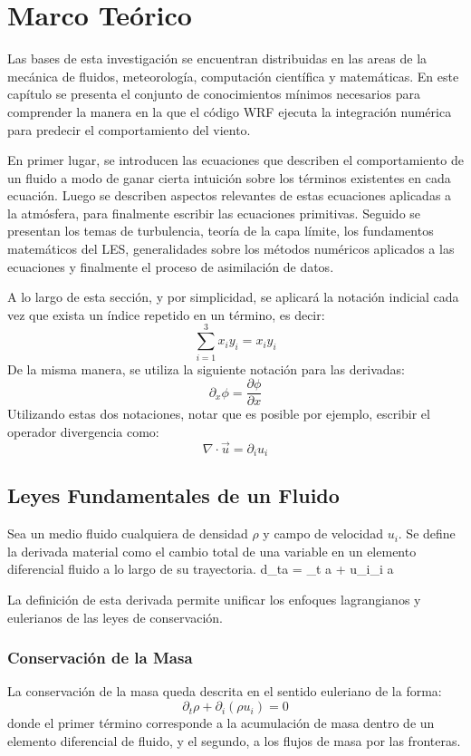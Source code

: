 \chapter{Marco Teórico}
Las bases de esta investigación se encuentran distribuidas en las areas de la mecánica de fluidos, meteorología, computación científica y matemáticas. En este capítulo se presenta el conjunto de conocimientos mínimos necesarios para comprender la manera en la que el código WRF ejecuta la integración numérica para predecir el comportamiento del viento. 

En primer lugar, se introducen las ecuaciones que describen el comportamiento de un fluido a modo de ganar cierta intuición sobre los términos existentes en cada ecuación. Luego se describen aspectos relevantes de estas ecuaciones aplicadas a la atmósfera, para finalmente escribir las ecuaciones primitivas. Seguido se presentan los temas de turbulencia, teoría de la capa límite, los fundamentos matemáticos del LES, generalidades sobre los métodos numéricos aplicados a las ecuaciones y finalmente el proceso de asimilación de datos.

A lo largo de esta sección, y por simplicidad, se aplicará la notación indicial cada vez que exista un índice repetido en un término, es decir:
\begin{equation}\label{eq:indicial}
\sum_{i=1}^{3}\! x_i y_i = x_i y_i
\end{equation}
De la misma manera, se utiliza la siguiente notación para las derivadas:
\begin{equation}
\partial_x \phi = \frac{\partial \phi}{\partial x}
\end{equation}
Utilizando estas dos notaciones, notar que es posible por ejemplo, escribir el operador divergencia como:
\begin{equation}\label{eq:divergencia}
\nabla\cdot\vec{u} = \partial_i u_i
\end{equation}
\section{Leyes Fundamentales de un Fluido}
Sea un medio fluido cualquiera de densidad $\rho$ y campo de velocidad $u_i$. Se define la derivada material como el cambio total de una variable en un elemento diferencial fluido a lo largo de su trayectoria.
\be 
d_ta = \partial_t a + u_i\partial_i a
\ee

La definición de esta derivada permite unificar los enfoques lagrangianos y eulerianos de las leyes de conservación.
\subsection{Conservación de la Masa}
La conservación de la masa queda descrita en el sentido euleriano de la forma:
\begin{equation}\label{eq:cons_masa}
\partial_t \rho + \partial_i(\rho u_i) = 0
\end{equation}
donde el primer término corresponde a la acumulación de masa dentro de un elemento diferencial de fluido, y el segundo, a los flujos de masa por las fronteras.

